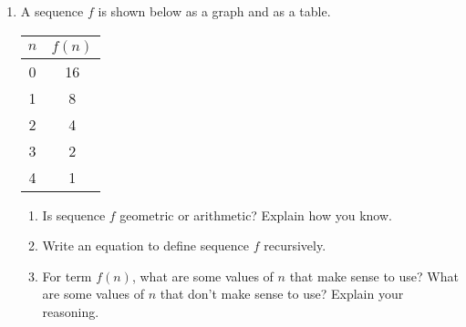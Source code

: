 \documentclass[12pt, twoside]{article}
\begin{document}
\begin{enumerate}[itemsep=0.5cm]
\newpage
\item A sequence $f$ is shown below as a graph and as a table.
\begin{multicols}{2}
\begin{center}
    \end{center}
    \begin{tabular}{c|c}
        $n$ & $f(n)$ \\ \hline
        0 & 16 \\ 
        1 & 8 \\ 
        2 & 4 \\ 
        3 & 2 \\ 
        4 & 1 \\ 
        \end{tabular}
    \end{multicols}
    \begin{enumerate}
        \item Is sequence $f$ geometric or arithmetic? Explain how you know. \vspace{2cm}
        \item Write an equation to define sequence $f$ recursively. \vspace{3cm}
        \item For term $f(n)$, what are some values of $n$ that make sense to use? What are some values of $n$ that don't make sense to use? Explain your reasoning.
    \end{enumerate}

\end{enumerate}
\end{document}
